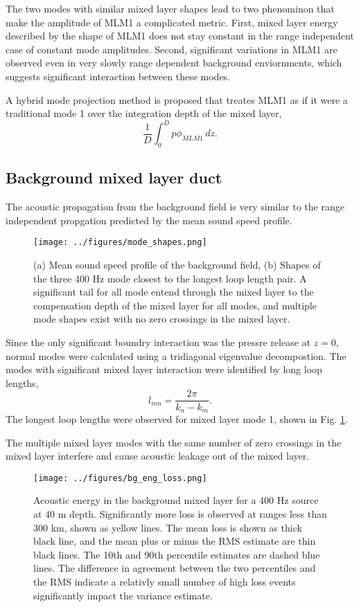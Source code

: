 \documentclass[preprint,NumberedRefs]{JASA}
\begin{document}
The two modes with similar mixed layer shapes lead to two phenominon that make the amplitude of MLM1 a complicated metric. First, mixed layer energy described by the shape of MLM1 does not stay constant in the range independent case of constant mode amplitudes. Second, significant variations in MLM1 are observed even in very slowly range dependent background enviornments, which suggests significant interaction between these modes.

A hybrid mode projection method is proposed that treates MLM1 as if it were a traditional mode 1 over the integration depth of the mixed layer,
\begin{equation}
    \frac{1}{D} \int^{D}_0 p \phi_{MLM1} \,  dz.
\end{equation}

\subsection{Background mixed layer duct}
The acoustic propagation from the background field is very similar to the range independent propgation predicted by the mean sound speed profile.
\begin{figure}
\texttt{[image: ../figures/mode\_shapes.png]}
    \caption{\label{fig:bg_modes}{(a) Mean sound speed profile of the background field, (b) Shapes of the three 400 Hz mode closest to the longest loop length pair. A significant tail for all mode entend through the mixed layer to the compensation depth of the mixed layer for all modes, and multiple mode shapes exist with no zero crossings in the mixed layer.}}
\end{figure}

Since the only significant boundry interaction was the pressre release at $z=0$, normal modes were calculated using a tridiagonal eigenvalue decompostion. The modes with significant mixed layer interaction were identified by long loop lengths,
\begin{equation}
    l_{mn} = \frac{2 \pi}{k_n - k_m}.
    \label{eq:loop_length}
\end{equation}
The longest loop lengths were observed for mixed layer mode 1, shown in Fig. \ref{fig:bg_modes}.

The multiple mixed layer modes with the same number of zero crossings in the mixed layer interfere and cause acoustic leakage out of the mixed layer.
\begin{figure}
\texttt{[image: ../figures/bg\_eng\_loss.png]}
    \caption{Acoustic energy in the background mixed layer for a 400 Hz source at 40 m depth. Significantly more loss is observed at ranges less than 300 km, shown as yellow lines. The mean loss is shown as thick black line, and the mean plus or minus the RMS estimate are thin black lines. The 10th and 90th percentile estimates are dashed blue lines. The difference in agreement between the two percentiles and the RMS indicate a relativly small number of high loss events significantly impact the variance estimate.}
    \label{fig:bg_eng}
\end{figure}
\end{document}
